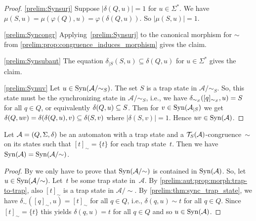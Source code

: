 \begin{proof}
	\ref{prelim:Synsurj} Suppose $|\delta(Q, u)| = 1$ for $u \in \Sigma^*$.
	We have $\mu(S, u) = \mu(\varphi(Q), u) = \varphi(\delta(Q, u))$.
	So $|\mu(S, u)| = 1$.	
	
	\ref{prelim:Syncongr} Applying~\ref{prelim:Synsurj} 
	to the canonical morphism for $\sim$
	from  \cref{prelim:prop:congruence_induces_morphism}
	gives the claim.
	
	
	
	
	\ref{prelim:Synsubaut} The equation $\delta_{|S}(S, u) \subseteq \delta(Q, u)$ for $u \in \Sigma^*$
	gives the claim.
	
	\ref{prelim:Synuv} Let $u \in \operatorname{Syn}(\mathcal A/{\sim_S})$.
	The set $S$ is a trap state in $\mathcal A / {\sim_S}$.
	So, this state must be the synchronizing state in $\mathcal A / {\sim_S}$, i.e., we have $\delta_{\sim_S}([q]_{\sim_S},u) = S$ for all $q \in Q$, or equivalently $\delta(Q,u) \subseteq S$.
	Then for $v \in \operatorname{Syn}(\mathcal A_{|S})$ we get 
	$\delta(Q,uv) = \delta(\delta(Q,u),v) \subseteq \delta(S,v)$ where $|\delta(S, v)| = 1$.
	Hence $uv \in \operatorname{Syn}(\mathcal A)$.
\end{proof}

\begin{corollary} \label{prelim:syncaut:cor:Syncongr}
	Let $\mathcal A = (Q, \Sigma, \delta)$ 
	be an automaton with a trap state and a $\mathcal T_S(\mathcal A)$-congruence~$\sim$ on its states
	such that  $[t]_{\sim} = \{t\}$ for each trap state~$t$.
	Then we have $\operatorname{Syn}(\mathcal A) = \operatorname{Syn}(\mathcal A / {\sim})$.
\end{corollary} 
\begin{proof}
	By  
	we only have to prove that $ \operatorname{Syn}(\mathcal A / {\sim})$
	is contained in $\operatorname{Syn}(\mathcal A)$.
	So, let $u \in \operatorname{Syn}(\mathcal A / {\sim})$.
	Let~$t$ be some trap state in~$\mathcal A$.
	By \cref{prelim:aut:prop:morph:trap-to-trap},
	also $[t]_{\sim}$ is a trap state in $\mathcal A / {\sim}$.
	By \cref{prelim:thm:sync_trap_state},
	we have $\delta_{\sim}([q]_{\sim}, u) = [t]_{\sim}$
	for all $q \in Q$,	i.e., $\delta(q, u) \sim t$ for all $q \in Q$.
	Since $[t]_{\sim} = \{t\}$
	this yields $\delta(q, u) = t$ for all $q \in Q$
	and so $u \in \operatorname{Syn}(\mathcal A)$.	
\end{proof}


